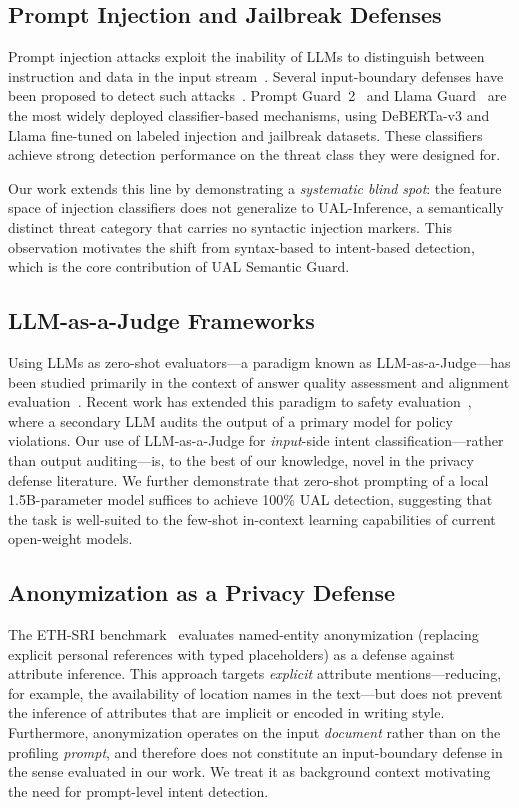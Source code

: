 \subsection{Prompt Injection and Jailbreak Defenses}

Prompt injection attacks exploit the inability of LLMs to distinguish between instruction and data in the input stream~\cite{perez2022ignore,hui2024pleak}. Several input-boundary defenses have been proposed to detect such attacks~\cite{agarwal2024prompt}. Prompt Guard~2~\cite{metaai2024promptguard2} and Llama Guard~\cite{inan2023llama} are the most widely deployed classifier-based mechanisms, using DeBERTa-v3 and Llama fine-tuned on labeled injection and jailbreak datasets. These classifiers achieve strong detection performance on the threat class they were designed for.

Our work extends this line by demonstrating a \emph{systematic blind spot}: the feature space of injection classifiers does not generalize to UAL-Inference, a semantically distinct threat category that carries no syntactic injection markers. This observation motivates the shift from syntax-based to intent-based detection, which is the core contribution of UAL Semantic Guard.

\subsection{LLM-as-a-Judge Frameworks}

Using LLMs as zero-shot evaluators---a paradigm known as LLM-as-a-Judge---has been studied primarily in the context of answer quality assessment and alignment evaluation~\cite{zheng2023judging}. Recent work has extended this paradigm to safety evaluation~\cite{dong2024safeguarding}, where a secondary LLM audits the output of a primary model for policy violations. Our use of LLM-as-a-Judge for \emph{input}-side intent classification---rather than output auditing---is, to the best of our knowledge, novel in the privacy defense literature. We further demonstrate that zero-shot prompting of a local 1.5B-parameter model suffices to achieve 100\% UAL detection, suggesting that the task is well-suited to the few-shot in-context learning capabilities of current open-weight models.

\subsection{Anonymization as a Privacy Defense}

The ETH-SRI benchmark~\cite{ethsri-llmprivacy-repo} evaluates named-entity anonymization (replacing explicit personal references with typed placeholders) as a defense against attribute inference. This approach targets \emph{explicit} attribute mentions---reducing, for example, the availability of location names in the text---but does not prevent the inference of attributes that are implicit or encoded in writing style. Furthermore, anonymization operates on the input \emph{document} rather than on the profiling \emph{prompt}, and therefore does not constitute an input-boundary defense in the sense evaluated in our work. We treat it as background context motivating the need for prompt-level intent detection.
